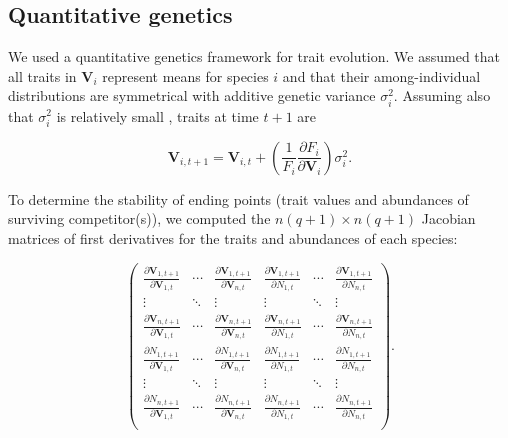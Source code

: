 \subsection*{Quantitative genetics}

We used a quantitative genetics framework for trait evolution.
We assumed that all traits in $\mathbf{V}_i$ represent means for species $i$
and that their among-individual distributions are symmetrical with additive
genetic variance $\sigma^2_i$.
Assuming also that $\sigma^2_i$ is relatively small
\citep{Iwasa:1991eo,Abrams:2001va,Abrams:1993cr}, traits at time $t+1$ are

\begin{equation} \label{eq:trait-change}
    \mathbf{V}_{i,t+1} = \mathbf{V}_{i,t} + \left( \frac{1}{F_i}
        \frac{\partial F_i}{\partial \mathbf{V}_{i}} \right) \sigma^2_i
    \textrm{.}
\end{equation}

To determine the stability of ending points (trait values and abundances of
surviving competitor(s)), we computed the $n (q+1) \times n (q+1)$ Jacobian matrices
of first derivatives for the traits and abundances of each species:

\begin{equation} \label{eq:jacobian}
    \begin{pmatrix}
        \frac{\partial \mathbf{V}_{1,t+1}}{\partial \mathbf{V}_{1,t}} & \cdots &
            \frac{\partial \mathbf{V}_{1,t+1}}{\partial \mathbf{V}_{n,t}} &
            \frac{\partial \mathbf{V}_{1,t+1}}{\partial N_{1,t}} & \cdots &
            \frac{\partial \mathbf{V}_{1,t+1}}{\partial N_{n,t}} \\
        \vdots & \ddots & \vdots & \vdots & \ddots & \vdots \\
        \frac{\partial \mathbf{V}_{n,t+1}}{\partial \mathbf{V}_{1,t}} & \cdots &
            \frac{\partial \mathbf{V}_{n,t+1}}{\partial \mathbf{V}_{n,t}} &
            \frac{\partial \mathbf{V}_{n,t+1}}{\partial N_{1,t}} & \cdots &
            \frac{\partial \mathbf{V}_{n,t+1}}{\partial N_{n,t}} \\[1ex]
%
%
        \frac{\partial N_{1,t+1}}{\partial \mathbf{V}_{1,t}} & \cdots &
            \frac{\partial N_{1,t+1}}{\partial \mathbf{V}_{n,t}} &
            \frac{\partial N_{1,t+1}}{\partial N_{1,t}} & \cdots &
            \frac{\partial N_{1,t+1}}{\partial N_{n,t}} \\
        \vdots & \ddots & \vdots & \vdots & \ddots & \vdots \\
        \frac{\partial N_{n,t+1}}{\partial \mathbf{V}_{1,t}} & \cdots &
            \frac{\partial N_{n,t+1}}{\partial \mathbf{V}_{n,t}} &
            \frac{\partial N_{n,t+1}}{\partial N_{1,t}} & \cdots &
            \frac{\partial N_{n,t+1}}{\partial N_{n,t}} \\
    \end{pmatrix}
    \text{.}
\end{equation}


